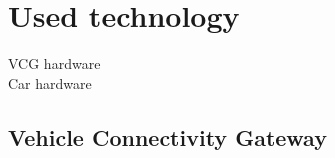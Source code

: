 \chapter{Used technology}

VCG hardware\\
Car hardware \\

\section{Vehicle Connectivity Gateway}
\label{sec::vcg}

\clearpage